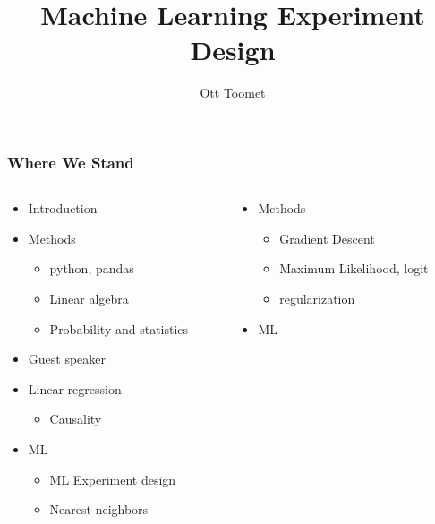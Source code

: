 \documentclass[mathserif, xcolor=table, svgnames]{beamer}
\title{Machine Learning Experiment Design}
\author{Ott Toomet}
\begin{document}
\lstset{language=Python}

\begin{frame}
  \maketitle
\end{frame}

\begin{frame}
  \tableofcontents
\end{frame}

\begin{frame}
\frametitle{Where We Stand}
\begin{columns}
  \begin{column}{0.5\linewidth}
    \begin{itemize}
    \item Introduction
    \item Methods
      \begin{itemize}
      \item python, pandas
      \item Linear algebra
      \item Probability and statistics
      \end{itemize}
    \item Guest speaker
    \item Linear regression
      \begin{itemize}
      \item Causality
      \end{itemize}
    \item ML
      \begin{itemize}
      \item \alert{ML Experiment design}
      \item Nearest neighbors
      \end{itemize}
    \end{itemize}
  \end{column}
  \begin{column}{0.5\linewidth}
    \begin{itemize}
    \item Methods
      \begin{itemize}
      \item Gradient Descent 
      \item Maximum Likelihood, logit
      \item regularization
      \end{itemize}
    \item ML

\end{itemize}
\end{column}
\end{columns}
\end{frame}
\end{document}
